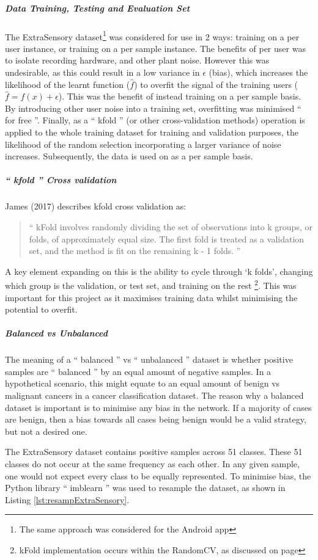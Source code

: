 \documentclass{UoNMCHA}
\newcommand{\inlineQuote}[1]{`` #1 ''}
\newcommand{\fancyquote}[1]{\begin{quotation}\inlineQuote{#1}\end{quotation}}
\newcommand{\lref}[1] {Listing \ref{#1}}
\numberwithin{equation}{section}
\begin{document}
\subparagraph{Data Training, Testing and Evaluation Set} \label{para:ExtraSensorydataset}
The ExtraSensory dataset\footnote{The same approach was considered for the Android app} was considered for use in 2 ways: training on a per user instance, or training on a per sample instance. The benefits of per user was to isolate recording hardware, and other plant noise. However this was undesirable, as this could result in a low variance in $\epsilon$ (bias), which increases the likelihood of the learnt function ($\hat{f}$) to overfit the signal of the training users ($ \hat{f} = f(x) + \epsilon$).
This was the benefit of instead training on a per sample basis. By introducing other user noise into a training set, overfitting was minimised \inlineQuote{for free}. Finally, as a \inlineQuote{kfold} (or other cross-validation methods) operation is applied to the whole training dataset for training and validation purposes, the likelihood of the random selection incorporating a larger variance of noise increases. Subsequently, the data is used on as a per sample basis.

\subparagraph{\inlineQuote{kfold} Cross validation}
James (2017) describes kfold cross validation as: 
\fancyquote{kFold involves randomly dividing the set of observations into k groups, or folds, of approximately equal size. The first fold is treated as a validation set, and the method is fit on the remaining k - 1 folds. \cite{James2017}} 
A key element expanding on this is the ability to cycle through `k folds', changing which group is the validation, or test set, and training on the rest \footnote{kFold implementation occurs within the RandomCV, as discussed on page \pageref{subsec:HypOpt}}. This was important for this project as it maximises training data whilst minimising the potential to overfit. 

\subparagraph{Balanced vs Unbalanced}
The meaning of a \inlineQuote{balanced} vs \inlineQuote{unbalanced} dataset is whether positive samples are \inlineQuote{balanced} by an equal amount of negative samples. In a hypothetical scenario, this might equate to an equal amount of benign vs malignant cancers in a cancer classification dataset. The reason why a balanced dataset is important is to minimise any bias in the network. If a majority of cases are benign, then a bias towards all cases being benign would be a valid strategy, but not a desired one. 

The ExtraSensory dataset contains positive samples across 51 classes. These 51 classes do not occur at the same frequency as each other. In any given sample, one would not expect every class to be equally represented. To minimise bias, the Python library \inlineQuote{imblearn} was used to resample the dataset, as shown in \lref{lst:resampExtraSensory}.
\end{document}

